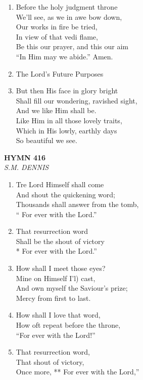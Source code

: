 \documentclass[11pt,a4paper]{article}
\begin{document}
\begin{enumerate}
    \item Before the holy judgment throne \\
        We'll see, as we in awe bow down, \\
        Our works in fire be tried, \\
        In view of that vedi flame, \\
        Be this our prayer, and this our aim \\
        ``In Him may we abide.'' Amen.

    \item The Lord's Future Purposes

    \item But then His face in glory bright \\
        Shall fill our wondering, ravished sight, \\
        And we like Him shall be. \\
        Like Him in all those lovely traits, \\
        Which in His lowly, earthly days \\
        So beautiful we see.

\end{enumerate}

\newpage
\begin{center}
    {\Large \textbf{HYMN 416}}
    \\
    \textit{S.M. DENNIS}
\end{center}
\vspace{1em}

\begin{enumerate}
    \item Tre Lord Himself shall come \\
        And shout the quickening word; \\
        Thousands shall answer from the tomb, \\
        `` For ever with the Lord.''

    \item That resurrection word \\
        Shall be the shout of victory \\
        * For ever with the Lord.''

    \item How shall I meet those eyes? \\
        Mine on Himself I'l) cast, \\
        And own myself the Saviour's prize; \\
        Mercy from first to last.

    \item How shall I love that word, \\
        How oft repeat before the throne, \\
        ``For ever with the Lord!''

    \item That resurrection word, \\
        That shout of victory, \\
        Once more, ** For ever with the Lord,''

\end{enumerate}
\end{document}
